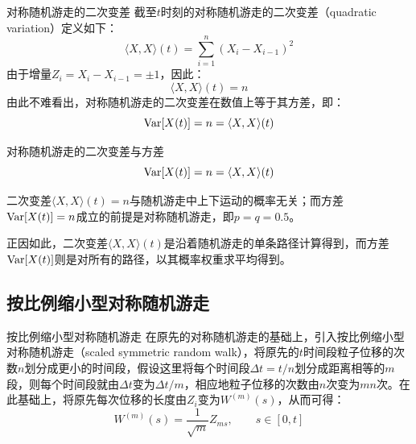 \documentclass[t]{beamer}
\newcommand{\Var}{{\rm Var}}
\begin{document}
\begin{frame}{对称随机游走的二次变差}
  截至$t$时刻的对称随机游走的二次变差（quadratic variation）定义如下：
  \begin{equation*}
  \langle X,X\rangle(t) =\sum^{n}_{i=1}(X_i-X_{i-1})^2
  \end{equation*}
  由于增量$Z_i=X_i-X_{i-1}=\pm 1$，因此：
  \begin{equation*}
  \langle X,X\rangle(t) =n
  \end{equation*}
  由此不难看出，对称随机游走的二次变差在数值上等于其方差，即：
  \begin{equation*}
  \Var[X(t)]=n=\langle X,X\rangle(t)
  \end{equation*}
\end{frame}


\begin{frame}{对称随机游走的二次变差与方差}
  \begin{equation*}
    \Var[X(t)]=n=\langle X,X\rangle(t)
    \end{equation*}

    二次变差$\langle X,X\rangle(t)=n$与随机游走中上下运动的概率无关；而方差$\Var[X(t)]=n$成立的前提是对称随机游走，即$p=q=0.5$。
    
    正因如此，二次变差$\langle X,X\rangle(t)$是沿着随机游走的单条路径计算得到，而方差$\Var[X(t)]$则是对所有的路径，以其概率权重求平均得到。
\end{frame}

\subsection{按比例缩小型对称随机游走}
\begin{frame}{按比例缩小型对称随机游走}
  在原先的对称随机游走的基础上，引入按比例缩小型对称随机游走（scaled symmetric random walk），将原先的$t$时间段粒子位移的次数$n$划分成更小的时间段，假设这里将每个时间段$\Delta t=t/n$划分成距离相等的$m$段，则每个时间段就由$\Delta t$变为$\Delta t/m$，相应地粒子位移的次数由$n$次变为$mn$次。在此基础上，将原先每次位移的长度由$Z_i$变为$W^{(m)}(s)$，从而可得：
  \begin{equation*}
  W^{(m)}(s)=\frac{1}{\sqrt{m}}Z_{ms},\qquad s\in[0,t]
  \end{equation*}
\end{frame}
\end{document}
